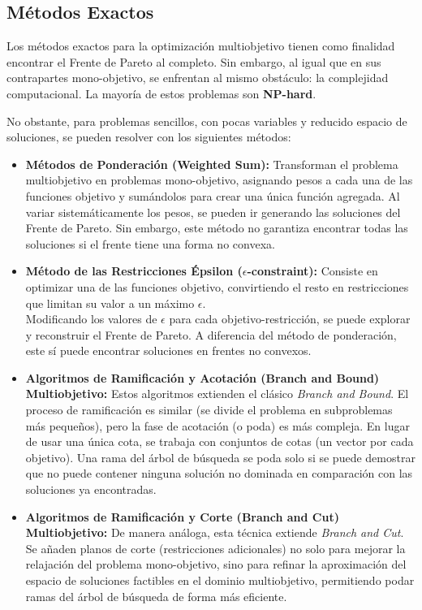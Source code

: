 \documentclass[12pt,a4paper]{book}
\begin{document}
\subsection{Métodos Exactos}

Los métodos exactos para la optimización multiobjetivo tienen como finalidad encontrar el Frente de Pareto al completo. Sin embargo, al igual que en sus contrapartes mono-objetivo, se enfrentan al mismo obstáculo: la complejidad computacional. La mayoría de estos problemas son \textbf{NP-hard}.

No obstante, para problemas sencillos, con pocas variables y reducido espacio de soluciones, se pueden resolver con los siguientes métodos:

\begin{itemize}
    \item \textbf{Métodos de Ponderación (Weighted Sum):} Transforman el problema multiobjetivo en problemas mono-objetivo, asignando pesos a cada una de las funciones objetivo y sumándolos para crear una única función agregada. Al variar sistemáticamente los pesos, se pueden ir generando las soluciones del Frente de Pareto. Sin embargo, este método no garantiza encontrar todas las soluciones si el frente tiene una forma no convexa.

    \item \textbf{Método de las Restricciones Épsilon ($\epsilon$-constraint):} Consiste en optimizar una de las funciones objetivo, convirtiendo el resto en restricciones que limitan su valor a un máximo $\epsilon$.\\
    Modificando los valores de $\epsilon$ para cada objetivo-restricción, se puede explorar y reconstruir el Frente de Pareto. A diferencia del método de ponderación, este sí puede encontrar soluciones en frentes no convexos.

    \item \textbf{Algoritmos de Ramificación y Acotación (Branch and Bound) Multiobjetivo:} Estos algoritmos extienden el clásico \textit{Branch and Bound}. El proceso de ramificación es similar (se divide el problema en subproblemas más pequeños), pero la fase de acotación (o poda) es más compleja. En lugar de usar una única cota, se trabaja con conjuntos de cotas (un vector por cada objetivo). Una rama del árbol de búsqueda se poda solo si se puede demostrar que no puede contener ninguna solución no dominada en comparación con las soluciones ya encontradas.

    \item \textbf{Algoritmos de Ramificación y Corte (Branch and Cut) Multiobjetivo:} De manera análoga, esta técnica extiende \textit{Branch and Cut}. Se añaden planos de corte (restricciones adicionales) no solo para mejorar la relajación del problema mono-objetivo, sino para refinar la aproximación del espacio de soluciones factibles en el dominio multiobjetivo, permitiendo podar ramas del árbol de búsqueda de forma más eficiente.
\end{itemize}
\end{document}
